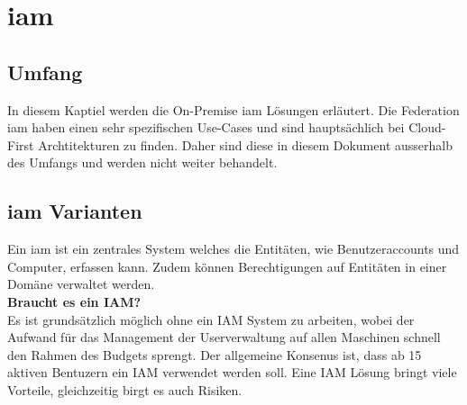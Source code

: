 \chapter{\acrfull{iam}}

\section{Umfang}
In diesem Kaptiel werden die On-Premise \acrfull{iam} Lösungen erläutert.
Die Federation \acrshort{iam} haben einen sehr spezifischen Use-Cases und sind hauptsächlich bei Cloud-First Archtitekturen zu finden. Daher sind diese in diesem Dokument ausserhalb des Umfangs und werden nicht weiter behandelt.

\section{\acrshort{iam} Varianten}
Ein \acrfull{iam} ist ein zentrales System welches die Entitäten, wie Benutzeraccounts und Computer, erfassen kann.
Zudem können Berechtigungen auf Entitäten in einer Domäne verwaltet werden.\\

\textbf{Braucht es ein IAM?}\\
Es ist grundsätzlich möglich ohne ein IAM System zu arbeiten, wobei der Aufwand für das Management der Userverwaltung auf allen Maschinen schnell den Rahmen des Budgets sprengt.
Der allgemeine Konsenus ist, dass ab 15 aktiven Bentuzern ein IAM verwendet werden soll.
Eine IAM Lösung bringt viele Vorteile, gleichzeitig birgt es auch Risiken.\\

